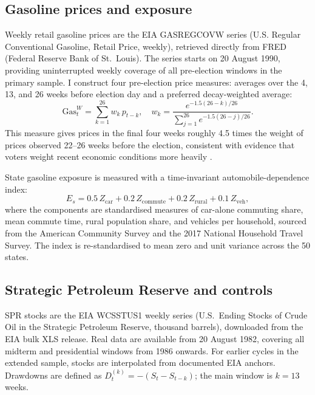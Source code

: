 \documentclass[12pt]{article}
\begin{document}
\subsection{Gasoline prices and exposure}

Weekly retail gasoline prices are the EIA GASREGCOVW series (U.S. Regular Conventional Gasoline, Retail Price, weekly), retrieved directly from FRED (Federal Reserve Bank of St.\ Louis). The series starts on 20 August 1990, providing uninterrupted weekly coverage of all pre-election windows in the primary sample. I construct four pre-election price measures: averages over the 4, 13, and 26 weeks before election day and a preferred decay-weighted average:
\begin{equation}
  \mathrm{Gas}^{W}_{t} = \sum_{k=1}^{26} w_k\, p_{t-k},
  \quad w_k = \frac{e^{-1.5(26-k)/26}}{\displaystyle\sum_{j=1}^{26}
  e^{-1.5(26-j)/26}}.
  \label{eq:gasW}
\end{equation}
This measure gives prices in the final four weeks roughly 4.5 times the weight of prices observed 22--26 weeks before the election, consistent with evidence that voters weight recent economic conditions more heavily \citep{Healy2010, Fiorina1981}.

State gasoline exposure is measured with a time-invariant automobile-dependence index:
\begin{equation}
  E_s = 0.5\,Z_{\mathrm{car}} + 0.2\,Z_{\mathrm{commute}}
      + 0.2\,Z_{\mathrm{rural}} + 0.1\,Z_{\mathrm{veh}},
  \label{eq:exposure}
\end{equation}
where the components are standardised measures of car-alone commuting share, mean commute time, rural population share, and vehicles per household, sourced from the American Community Survey and the 2017 National Household Travel Survey. The index is re-standardised to mean zero and unit variance across the 50 states.

\subsection{Strategic Petroleum Reserve and controls}

SPR stocks are the EIA WCSSTUS1 weekly series (U.S.\ Ending Stocks of Crude Oil in the Strategic Petroleum Reserve, thousand barrels), downloaded from the EIA bulk XLS release. Real data are available from 20 August 1982, covering all midterm and presidential windows from 1986 onwards. For earlier cycles in the extended sample, stocks are interpolated from documented EIA anchors. Drawdowns are defined as $D_t^{(k)}=-(S_t-S_{t-k})$; the main window is $k=13$ weeks.
\end{document}
